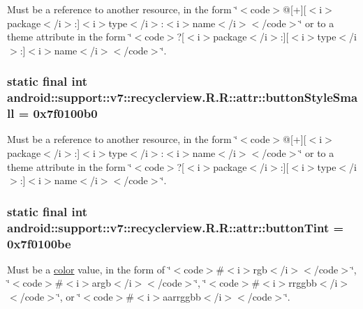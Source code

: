 Must be a reference to another resource, in the form \char`\"{}$<$code$>$@\mbox{[}+\mbox{]}\mbox{[}$<$i$>$package$<$/i$>$:\mbox{]}$<$i$>$type$<$/i$>$:$<$i$>$name$<$/i$>$$<$/code$>$\char`\"{} or to a theme attribute in the form \char`\"{}$<$code$>$?\mbox{[}$<$i$>$package$<$/i$>$:\mbox{]}\mbox{[}$<$i$>$type$<$/i$>$:\mbox{]}$<$i$>$name$<$/i$>$$<$/code$>$\char`\"{}. \hypertarget{classandroid_1_1support_1_1v7_1_1recyclerview_1_1_r_1_1attr_1e8ff13c046bffdad4213ac27f3aff9b}{
\subsubsection[{buttonStyleSmall}]{\setlength{\rightskip}{0pt plus 5cm}static final int android::support::v7::recyclerview.R.R::attr::buttonStyleSmall = 0x7f0100b0}}
\label{classandroid_1_1support_1_1v7_1_1recyclerview_1_1_r_1_1attr_1e8ff13c046bffdad4213ac27f3aff9b}


Must be a reference to another resource, in the form \char`\"{}$<$code$>$@\mbox{[}+\mbox{]}\mbox{[}$<$i$>$package$<$/i$>$:\mbox{]}$<$i$>$type$<$/i$>$:$<$i$>$name$<$/i$>$$<$/code$>$\char`\"{} or to a theme attribute in the form \char`\"{}$<$code$>$?\mbox{[}$<$i$>$package$<$/i$>$:\mbox{]}\mbox{[}$<$i$>$type$<$/i$>$:\mbox{]}$<$i$>$name$<$/i$>$$<$/code$>$\char`\"{}. \hypertarget{classandroid_1_1support_1_1v7_1_1recyclerview_1_1_r_1_1attr_a0838e9a0f1bec810b071d565fb924ee}{
\subsubsection[{buttonTint}]{\setlength{\rightskip}{0pt plus 5cm}static final int android::support::v7::recyclerview.R.R::attr::buttonTint = 0x7f0100be}}
\label{classandroid_1_1support_1_1v7_1_1recyclerview_1_1_r_1_1attr_a0838e9a0f1bec810b071d565fb924ee}


Must be a \hyperlink{classandroid_1_1support_1_1v7_1_1recyclerview_1_1_r_1_1color}{color} value, in the form of \char`\"{}$<$code$>$\#$<$i$>$rgb$<$/i$>$$<$/code$>$\char`\"{}, \char`\"{}$<$code$>$\#$<$i$>$argb$<$/i$>$$<$/code$>$\char`\"{}, \char`\"{}$<$code$>$\#$<$i$>$rrggbb$<$/i$>$$<$/code$>$\char`\"{}, or \char`\"{}$<$code$>$\#$<$i$>$aarrggbb$<$/i$>$$<$/code$>$\char`\"{}. 

